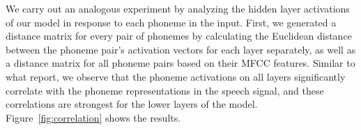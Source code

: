 


We carry out an analogous experiment by analyzing the hidden layer activations of our model in 
response to each phoneme in the input. First, we generated a distance matrix 
for every pair of phonemes by calculating the Euclidean distance between the 
phoneme pair's activation vectors for each layer separately, as well as a 
distance matrix for all phoneme pairs based on their MFCC features. Similar to 
what \citet{khalighinejad2017dynamic} report,  we observe that the phoneme 
activations on all layers significantly correlate with the phoneme representations 
in the speech signal, and these correlations are strongest for 
the lower layers of the model. Figure~\ref{fig:correlation} shows the results.

%



